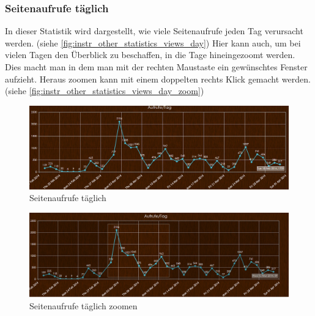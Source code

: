 \subsubsection{Seitenaufrufe täglich}
In dieser Statistik wird dargestellt, wie viele Seitenaufrufe jeden Tag verursacht werden. (siehe \autoref{fig:instr_other_statistics_views_day}) Hier kann auch, um bei vielen Tagen den Überblick zu beschaffen, in die Tage hineingezoomt werden. Dies macht man in dem man mit der rechten Maustaste ein gewünschtes Fenster aufzieht. Heraus zoomen kann mit einem doppelten rechts Klick gemacht werden. (siehe \autoref{fig:instr_other_statistics_views_day_zoom})
\begin{figure}[H]
\centering
\includegraphics[keepaspectratio=true, width=17cm]{images/screenshots/statistics_views_day.png}
\caption{Seitenaufrufe täglich}
\label{fig:instr_other_statistics_views_day}
\end{figure}
\begin{figure}[H]
\centering
\includegraphics[keepaspectratio=true, width=17cm]{images/screenshots/statistics_views_day_zoom.png}
\caption{Seitenaufrufe täglich zoomen}
\label{fig:instr_other_statistics_views_day_zoom}
\end{figure}
